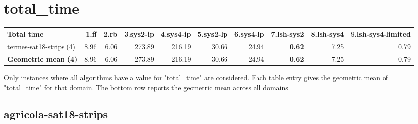 \documentclass{article}
\newcommand{\numtasks}[1]{\small{(#1)}}
\begin{document}
\hypertarget{total_time}{}
\section*{total\_time}

\begin{tabular}{@{}lrrrrrrrrr@{}}
Total time & 1.ff & 2.rb & 3.sys2-ip & 4.sys4-ip & 5.sys2-lp & 6.sys4-lp & 7.lsh-sys2 & 8.lsh-sys4 & 9.lsh-sys4-limited \\
\midrule
termes-sat18-strips \numtasks{4} & 8.96 & 6.06 & 273.89 & 216.19 & 30.66 & 24.94 & \textbf{0.62} & 7.25 & 0.79 \\
\textbf{Geometric mean \numtasks{4}} & 8.96 & 6.06 & 273.89 & 216.19 & 30.66 & 24.94 & \textbf{0.62} & 7.25 & 0.79 \\
\end{tabular}

Only instances where all algorithms have a value for "total\_time" are considered. Each table entry gives the geometric mean of "total\_time" for that domain. The bottom row reports the geometric mean across all domains.

\hypertarget{total_time-agricola-sat18-strips}{}
\subsection*{agricola-sat18-strips}
\end{document}
